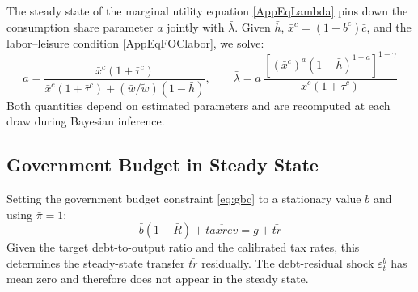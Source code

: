 The steady state of the marginal utility equation \eqref{AppEqLambda} pins down the consumption share parameter $a$ jointly with $\bar{\lambda}$. Given $\bar{h}$, $\bar{x}^c = (1 - b^c)\bar{c}$, and the labor--leisure condition \eqref{AppEqFOClabor}, we solve:
\begin{equation}\label{AppEqSSa}
    a = \frac{\bar{x}^c (1 + \bar{\tau}^c)}{\bar{x}^c (1 + \bar{\tau}^c) + (\bar{w}/\tilde{w})(1-\bar{h})}, \qquad
    \bar{\lambda} = a\,\frac{\left[(\bar{x}^c)^a (1-\bar{h})^{1-a}\right]^{1-\gamma}}{\bar{x}^c (1+\bar{\tau}^c)}
\end{equation}
Both quantities depend on estimated parameters and are recomputed at each draw during Bayesian inference.

\subsection{Government Budget in Steady State}

Setting the government budget constraint \eqref{eq:gbc} to a stationary value $\bar{b}$ and using $\bar{\pi} = 1$:
\begin{equation}\label{AppEqSSbudget}
    \bar{b}\left(1 - \bar{R}\right) + \overline{taxrev} = \bar{g} + \bar{tr}
\end{equation}
Given the target debt-to-output ratio and the calibrated tax rates, this determines the steady-state transfer $\bar{tr}$ residually. The debt-residual shock $\varepsilon_t^b$ has mean zero and therefore does not appear in the steady state.
